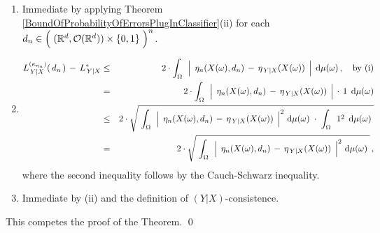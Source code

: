 \begin{enumerate}
\item
	Immediate by applying Theorem \ref{BoundOfProbabilityOfErrorsPlugInClassifier}(ii) for each
	$d_{n} \in \left(\;(\Re^{d},\mathcal{O}(\Re^{d})) \overset{{\color{white}.}}{\times} \{0,1\} \;\right)^{n}$.
\item
	\begin{eqnarray*}
	L^{(\kappa_{\eta_{n}})}_{\,Y \vert X}(\,d_{n}\,) \, - \, L^{*}_{\,Y \vert X}
	& \leq &
		2 \cdot \int_{\Omega}\,\;
			\left\vert\;\, \eta_{n}(X(\omega),d_{n}) \,\overset{{\color{white}.}}{-}\, \eta_{\,Y\vert X}(X(\omega)) \;\,\right\vert
			\;\d\mu(\omega)\,,
		\quad
		\textnormal{by (i)}
	\\
	& = &
		2 \cdot \int_{\Omega}\,\;
			\left\vert\;\, \eta_{n}(X(\omega),d_{n}) \,\overset{{\color{white}.}}{-}\, \eta_{\,Y\vert X}(X(\omega)) \;\,\right\vert
			\,\cdot\, 1
			\,\;\d\mu(\omega)
	\\
	& \leq &
		2 \cdot \sqrt{\;
			\int_{\Omega}\,\;
			\left\vert\;\, \eta_{n}(X(\omega),d_{n}) \,\overset{{\color{white}.}}{-}\, \eta_{\,Y\vert X}(X(\omega)) \;\,\right\vert^{2}
			\,\d\mu(\omega)
			\;\cdot\;
			\int_{\Omega}\,\; 1^{2} \,\;\d\mu(\omega)
			\;}
	\\
	& = &
		2 \cdot \sqrt{\;
			\int_{\Omega}\,\;
			\left\vert\;\, \eta_{n}(X(\omega),d_{n}) \,\overset{{\color{white}.}}{-}\, \eta_{\,Y\vert X}(X(\omega)) \;\,\right\vert^{2}
			\,\d\mu(\omega)
			\;}\,,
	\end{eqnarray*}
	where the second inequality follows by the Cauch-Schwarz inequality.
\item
	Immediate by (ii) and the definition of $(Y \vert X)$-consistence.
\end{enumerate}
This competes the proof of the Theorem.
\qed


\renewcommand{\theenumi}{\roman{enumi}}
\renewcommand{\labelenumi}{\textnormal{(\theenumi)}$\;\;$}

